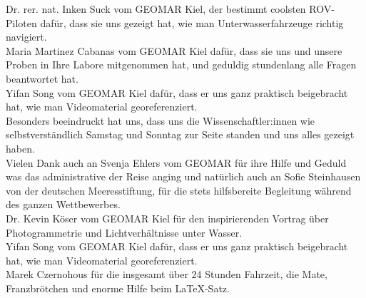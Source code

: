 Dr. rer. nat. Inken Suck vom GEOMAR Kiel, der bestimmt coolsten ROV-Piloten dafür, dass sie uns gezeigt hat, wie man Unterwasserfahrzeuge richtig navigiert. \\



Maria Martinez Cabanas vom GEOMAR Kiel dafür, dass sie uns und unsere Proben in Ihre Labore mitgenommen hat, und geduldig stundenlang alle Fragen beantwortet hat.\\



Yifan Song vom GEOMAR Kiel dafür, dass er uns ganz praktisch beigebracht hat, wie man Videomaterial georeferenziert.\\



Besonders beeindruckt hat uns, dass uns die Wissenschaftler:innen wie selbstverständlich Samstag und Sonntag zur Seite standen und uns alles gezeigt haben.\\



Vielen Dank auch an Svenja Ehlers vom GEOMAR für ihre Hilfe und Geduld was das administrative der Reise anging und natürlich auch an Sofie Steinhausen von der deutschen Meeresstiftung, für die stets hilfsbereite Begleitung während des ganzen Wettbewerbes.\\



Dr. Kevin Köser vom GEOMAR Kiel für den inspirierenden Vortrag über Photogrammetrie und Lichtverhältnisse unter Wasser.\\



Yifan Song vom GEOMAR Kiel dafür, dass er uns ganz praktisch beigebracht hat, wie man Videomaterial georeferenziert.\\



Marek Czernohous für die insgesamt über 24 Stunden Fahrzeit, die Mate, Franzbrötchen und enorme Hilfe beim \LaTeX -Satz.\\


